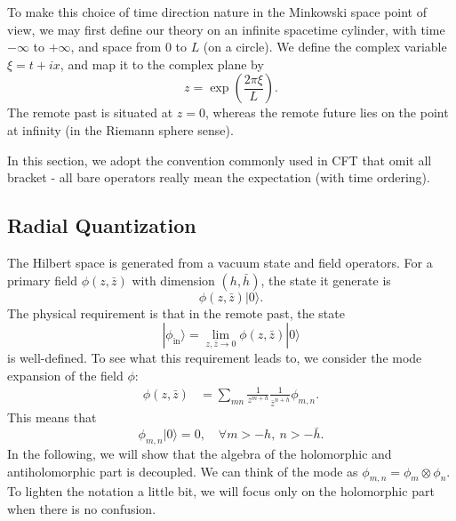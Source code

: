 \documentclass[aps,prb,superscriptaddress,nofootinbib]{revtex4}
\begin{document}
To make this choice of time direction nature in the Minkowski space point of view, we may first define our theory on an infinite spacetime cylinder, with time $-\infty$ to $+\infty$, and space from $0$ to $L$ (on a circle). 
We define the complex variable $\xi = t + ix$, and map it to the complex plane by
\begin{equation}
	z = \exp\left(\frac{2\pi \xi}{L}\right).
\end{equation} 
The remote past is situated at $z=0$, whereas the remote future lies on the point at infinity (in the Riemann sphere sense).

In this section, we adopt the convention commonly used in CFT that omit all bracket - all bare operators really mean the expectation (with time ordering).


\subsection{Radial Quantization}

The Hilbert space is generated from a vacuum state and field operators.
For a primary field $\phi(z,\bar z)$ with dimension $(h,\bar h)$, the state it generate is
\begin{equation}
	\phi(z,\bar z)|0\rangle.
\end{equation}
The physical requirement is that in the remote past, the state 
\begin{equation}
	|\phi_{\mathrm{in}}\rangle = \lim_{z,\bar z\rightarrow 0} \phi(z,\bar z)|0\rangle
\end{equation}
is well-defined.
To see what this requirement leads to, we consider the mode expansion of the field $\phi$:
\begin{equation}
\begin{aligned}
	\phi(z,\bar z) &= \sum_{mn} \frac{1}{z^{m+h}} \frac{1}{\bar z^{n+\bar h}} \phi_{m,n}.
\end{aligned}
\end{equation}
This means that
\begin{equation}
	\phi_{m,n}|0\rangle = 0,\quad \forall m > -h,\ n>-\bar h.
\end{equation}
In the following, we will show that the algebra of the holomorphic and antiholomorphic part is decoupled.
We can think of the mode as $\phi_{m,n} = \phi_m \otimes \phi_n$.
To lighten the notation a little bit, we will focus only on the holomorphic part when there is no confusion.
\end{document}
